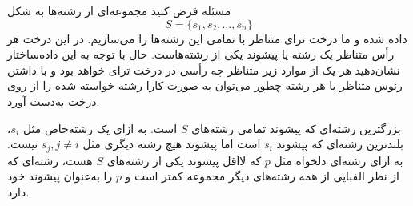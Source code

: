 ‌مسئله
فرض کنید مجموعه‌ای از رشته‌ها به شکل
$$S = \{s_1, s_2, ..., s_n\}$$
داده شده و ما درخت ترای متناظر با تمامی این رشته‌ها را می‌سازیم. در این درخت هر رأس متناظر یک رشته یا پیشوند یکی از رشته‌هاست. حال با توجه به این داده‌ساختار نشان‌دهید هر یک از موارد زیر متناظر چه رأسی در درخت ترای خواهد بود و با داشتن رئوس متناظر با هر رشته چطور می‌توان به صورت کارا رشته خواسته شده را از روی درخت به‌دست آورد. 






بزرگترین رشته‌ای که پیشوند تمامی رشته‌های $S$ است.
به ازای یک رشته‌خاص مثل $s_i$، بلندترین رشته‌ای که پیشوند $s_i$ است اما پیشوند هیچ رشته دیگری مثل
$s_j, j \neq i$
نیست.
به ازای رشته‌ای دلخواه مثل $p$ که لااقل پیشوند یکی از رشته‌های $S$ هست، رشته‌ای که از نظر الفبایی از همه رشته‌های دیگر مجموعه کمتر است و $p$ را به‌عنوان پیشوند خود دارد.












